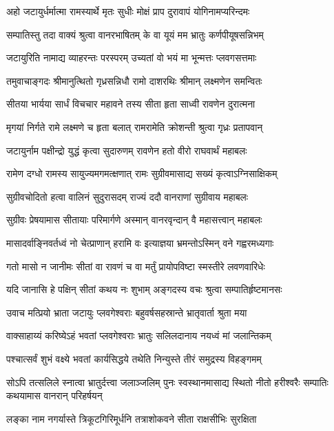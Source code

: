 \twolineshloka
{अहो जटायुर्धर्मात्मा रामस्यार्थे मृतः सुधीः}
{मोक्षं प्राप दुरावापं योगिनामप्यरिन्दमः} %

\twolineshloka
{सम्पातिस्तु तदा वाक्यं श्रुत्वा वानरभाषितम्}
{के वा यूयं मम भ्रातुः कर्णपीयूषसन्निभम्} %

\twolineshloka
{जटायुरिति नामाद्य व्याहरन्तः परस्परम्}
{उच्यतां वो भयं मा भून्मत्तः प्लवगसत्तमाः} %

\twolineshloka
{तमुवाचाङ्गदः श्रीमानुत्थितो गृध्रसन्निधौ}
{रामो दाशरथिः श्रीमान् लक्ष्मणेन समन्वितः} %

\twolineshloka
{सीतया भार्यया सार्धं विचचार महावने}
{तस्य सीता हृता साध्वी रावणेन दुरात्मना} %

\twolineshloka
{मृगयां निर्गते रामे लक्ष्मणे च हृता बलात्}
{रामरामेति क्रोशन्ती श्रुत्वा गृध्रः प्रतापवान्} %

\twolineshloka
{जटायुर्नाम पक्षीन्द्रो युद्धं कृत्वा सुदारुणम्}
{रावणेन हतो वीरो राघवार्थं महाबलः} %

\twolineshloka
{रामेण दग्धो रामस्य सायुज्यमगमत्क्षणात्}
{रामः सुग्रीवमासाद्य सख्यं कृत्वाऽग्निसाक्षिकम्} %

\twolineshloka
{सुग्रीवचोदितो हत्वा वालिनं सुदुरासदम्}
{राज्यं ददौ वानराणां सुग्रीवाय महाबलः} %

\twolineshloka
{सुग्रीवः प्रेषयामास सीतायाः परिमार्गणे}
{अस्मान् वानरवृन्दान् वै महासत्त्वान् महाबलः} %

\twolineshloka
{मासादर्वाङ्निवर्तध्वं नो चेत्प्राणान् हरामि वः}
{इत्याज्ञया भ्रमन्तोऽस्मिन् वने गह्वरमध्यगाः} %

\twolineshloka
{गतो मासो न जानीमः सीतां वा रावणं च वा}
{मर्तुं प्रायोपविष्टा स्मस्तीरे लवणवारिधेः} %

\twolineshloka
{यदि जानासि हे पक्षिन् सीतां कथय नः शुभाम्}
{अङ्गदस्य वचः श्रुत्वा सम्पातिर्हृष्टमानसः} %

\twolineshloka
{उवाच मत्प्रियो भ्राता जटायुः प्लवगेश्वराः}
{बहुवर्षसहस्रान्ते भ्रातृवार्ता श्रुता मया} %

\twolineshloka
{वाक्साहाय्यं करिष्येऽहं भवतां प्लवगेश्वराः}
{भ्रातुः सलिलदानाय नयध्वं मां जलान्तिकम्} %

\twolineshloka
{पश्चात्सर्वं शुभं वक्ष्ये भवतां कार्यसिद्धये}
{तथेति निन्युस्ते तीरं समुद्रस्य विहङ्गमम्} %

\threelineshloka
{सोऽपि तत्सलिले स्नात्वा भ्रातुर्दत्त्वा जलाञ्जलिम्}
{पुनः स्वस्थानमासाद्य स्थितो नीतो हरीश्वरैः}
{सम्पातिः कथयामास वानरान् परिहर्षयन्} %

\twolineshloka
{लङ्का नाम नगर्यास्ते त्रिकूटगिरिमूर्धनि}
{तत्राशोकवने सीता राक्षसीभिः सुरक्षिता} %

